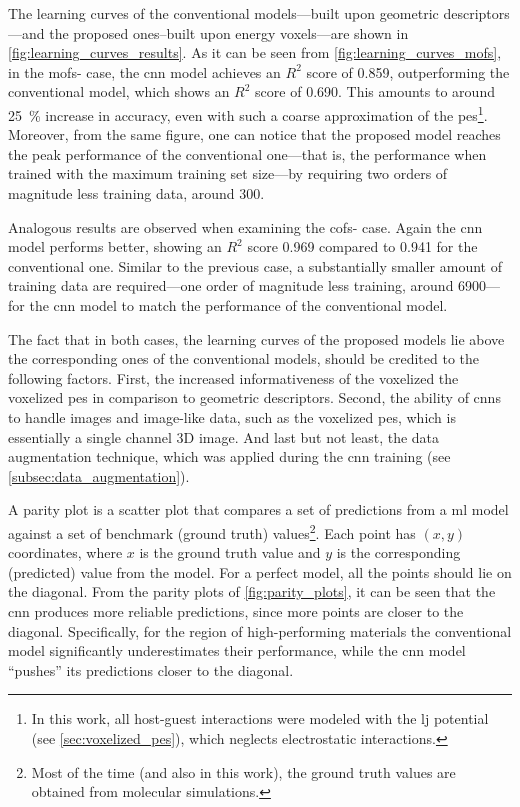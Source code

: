 The learning curves of the conventional models---built
upon geometric descriptors---and the proposed ones--built upon energy
voxels---are shown in \Figure{} \ref{fig:learning_curves_results}. As it can be
seen from \Figure{} \ref{fig:learning_curves_mofs}, in the \glspl{mof}- case,
the \gls{cnn} model achieves an $R^2$ score of \num{0.859}, outperforming the
conventional model, which shows an $R^2$ score of \num{0.690}. This amounts to
around \SI{25}{\percent} increase in accuracy, even with such a coarse
approximation of the \gls{pes}\footnote{In this work, all host-guest
interactions were modeled with the \gls{lj} potential (see \Section{}
\ref{sec:voxelized_pes}), which neglects electrostatic interactions.}. Moreover,
from the same figure, one can notice that the proposed model reaches the peak
performance of the conventional one---that is, the performance when trained with
the maximum training set size---by requiring two orders of magnitude less
training data, around \num{300}.

Analogous results are observed when examining the \glspl{cof}- case. Again
the \gls{cnn} model performs better, showing an $R^2$ score \num{0.969} compared
to \num{0.941} for the conventional one. Similar to the previous case, a
substantially smaller amount of training data are required---one order of
magnitude less training, around \num{6900}---for the \gls{cnn} model to match
the performance of the conventional model.

The fact that in both cases, the learning curves of the proposed models lie
above the corresponding ones of the conventional models, should be credited to
the following factors. First, the increased informativeness of the voxelized the
voxelized \gls{pes} in comparison to geometric descriptors. Second, the ability
of \glspl{cnn} to handle images and image-like data, such
as the voxelized \gls{pes}, which is essentially a single channel 3D image. And
last but not least, the data augmentation technique,
which was applied during the \gls{cnn} training (see \Section{}
\ref{subsec:data_augmentation}).

A parity plot is a scatter plot that compares a set of predictions from a
\gls{ml} model against a set of benchmark (ground truth) values\footnote{Most of
the time (and also in this work), the ground truth values are obtained from
molecular simulations.}. Each point has $(x, y)$ coordinates, where $x$ is the
ground truth value and $y$ is the corresponding (predicted) value from the
model. For a perfect model, all the points should lie on the diagonal. From the
parity plots of \Figure{} \ref{fig:parity_plots}, it can
be seen that the \gls{cnn} produces more reliable predictions, since more points
are closer to the diagonal. Specifically, for the region of high-performing
materials the conventional model significantly underestimates their performance,
while the \gls{cnn} model ``pushes'' its predictions closer to the diagonal.

